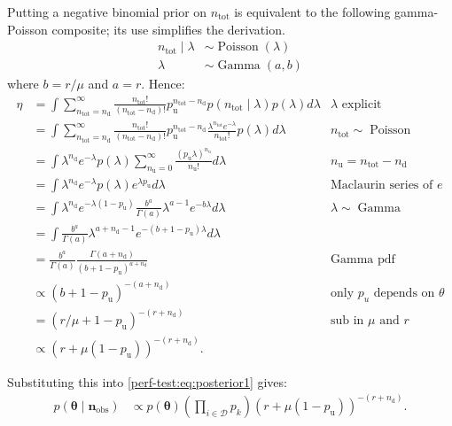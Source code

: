 \documentclass[12pt]{article}
\def\dist{\sim}
\DeclareMathOperator{\Poi}{Poisson}
\DeclareMathOperator{\GamDist}{Gamma}
\newcommand\set{\mathcal}
\renewcommand{\vec}[1]{\bm{#1}}
\newcommand{\ntot}{n_\text{tot}}
\newcommand{\ndet}{n_\text{d}}
\newcommand{\nnodet}{n_\text{u}}
\newcommand{\pnodet}{p_\text{u}}
\newcommand{\na}{\vec{n}_\text{obs}}
\begin{document}
Putting a negative binomial prior on $\ntot$ is equivalent to the following gamma-Poisson composite; its use simplifies the derivation.
\begin{align}
\ntot \mid \lambda &\dist \Poi(\lambda) \\
\lambda &\dist \GamDist(a, b)
\end{align}
where $b = r / \mu$ and $a = r$.
Hence:
\begin{align}
\eta
&= \int \sum_{\ntot=\ndet}^\infty \frac{\ntot!}{(\ntot-\ndet)!} \pnodet^{\ntot-\ndet} p(\ntot \mid \lambda) p(\lambda) d\lambda &\text{$\lambda$ explicit}\\
&= \int \sum_{\ntot=\ndet}^\infty \frac{\ntot!}{(\ntot-\ndet)!} \pnodet^{\ntot-\ndet} \frac{\lambda^{\ntot} e^{-\lambda}}{\ntot!} p(\lambda) d\lambda &\ntot \dist \Poi\\
&= \int \lambda^{\ndet} e^{-\lambda} p(\lambda) \sum_{\nnodet=0}^\infty \frac{(\pnodet \lambda)^{\nnodet}}{\nnodet!} d\lambda &\nnodet = \ntot-\ndet\\
&= \int \lambda^{\ndet} e^{-\lambda} p(\lambda) e^{\lambda \pnodet} d\lambda &\text{Maclaurin series of $e$} \\
&= \int \lambda^{\ndet} e^{-\lambda(1 - \pnodet)} \frac{b^a}{\Gamma(a)} \lambda^{a-1} e^{-b\lambda} d\lambda &\lambda \dist \GamDist\\
&= \int \frac{b^a}{\Gamma(a)} \lambda^{a+\ndet-1} e^{-(b+1-\pnodet)\lambda} d\lambda \\
&= \frac{b^a}{\Gamma(a)} \frac{\Gamma(a+\ndet)}{(b+1-\pnodet)^{a+\ndet}} &\text{Gamma pdf}\\
&\propto (b+1-\pnodet)^{-(a+\ndet)} &\text{only $p_u$ depends on $\theta$}\\
&= (r/\mu + 1 - \pnodet)^{-(r+\ndet)} &\text{sub in $\mu$ and $r$}\\
&\propto(r + \mu (1- \pnodet))^{-(r+\ndet)}.
\end{align}

Substituting this into \cref{perf-test:eq:posterior1} gives:
\begin{align}
p(\vec{\theta} \mid \na)
&\propto p(\vec{\theta}) \left( \prod_{i \in \set{D}} p_k \right) (r + \mu (1- \pnodet))^{-(r+\ndet)} \label{perf-test:eq:full-posterior}.
\end{align}
\end{document}
